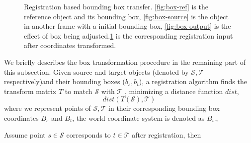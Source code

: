 \documentclass[letterpaper, 10 pt, conference]{ieeeconf}  %
\begin{document}
\begin{figure}[t]
\begin{subfigure}[t]{0.18\linewidth}
		\caption{}\label{fig:reg-input}
	\end{subfigure}\hfill

	
	\caption{Registration based bounding box transfer. \ref{fig:box-ref} is the reference object and its bounding box, \ref{fig:box-source} is the object in another frame with a initial  bounding box, \ref{fig:box-output} is the effect of box being adjusted.\ref{fig:reg-input} is the corresponding registration input after coordinates transformed.}
	\label {fig:annotation-transfer}
\end{figure}


We briefly describes the box transformation procedure in the remaining part of this subsection. Given source and target objects (denoted by $\mathcal{S,T}$ respectively)and their bounding boxes ($b_s,b_t$), a registration algorithm finds the transform matrix $T$ to match $\mathcal{S}$ with $\mathcal{T}$ , minimizing a distance function $dist$,
$$dist(T(\mathcal{S}),\mathcal{T})$$
where we represent points of $\mathcal{S,T}$ in their corresponding bounding box coordinates $B_s$ and $B_t$, the world coordinate system is denoted as $B_w$,

Assume point $s \in \mathcal{S}$ corresponds to $t \in \mathcal{T}$ after registration, then
\end{document}
